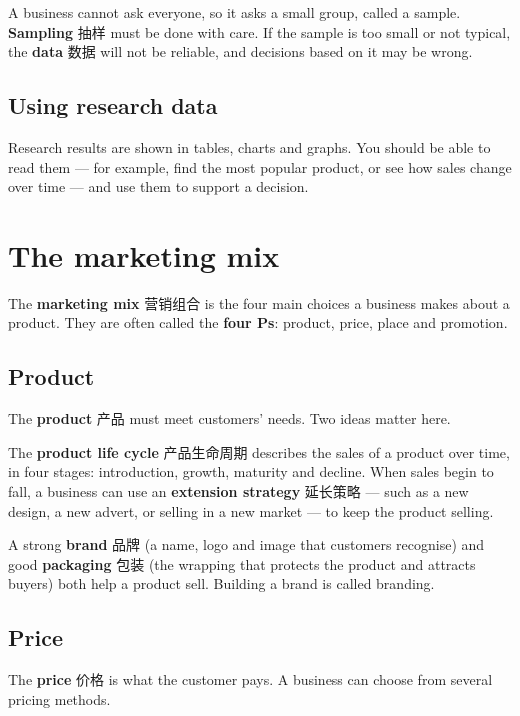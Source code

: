 \documentclass[11pt]{article}
\begin{document}
A business cannot ask everyone, so it asks a small group, called a sample. \textbf{Sampling} 抽样 must be done with care. If the sample is too small or not typical, the \textbf{data} 数据 will not be reliable, and decisions based on it may be wrong.

\subsection*{Using research data}

Research results are shown in tables, charts and graphs. You should be able to read them — for example, find the most popular product, or see how sales change over time — and use them to support a decision.

\section*{The marketing mix}

The \textbf{marketing mix} 营销组合 is the four main choices a business makes about a product. They are often called the \textbf{four Ps}: product, price, place and promotion.

\subsection*{Product}

The \textbf{product} 产品 must meet customers' needs. Two ideas matter here.

The \textbf{product life cycle} 产品生命周期 describes the sales of a product over time, in four stages: introduction, growth, maturity and decline. When sales begin to fall, a business can use an \textbf{extension strategy} 延长策略 — such as a new design, a new advert, or selling in a new market — to keep the product selling.

A strong \textbf{brand} 品牌 (a name, logo and image that customers recognise) and good \textbf{packaging} 包装 (the wrapping that protects the product and attracts buyers) both help a product sell. Building a brand is called branding.

\subsection*{Price}

The \textbf{price} 价格 is what the customer pays. A business can choose from several pricing methods.
\end{document}
